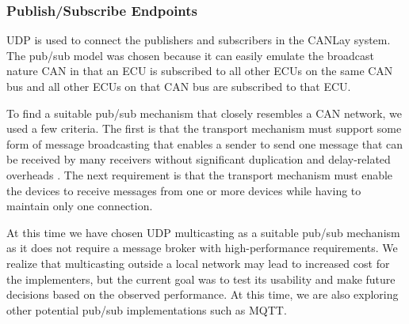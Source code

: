 \documentclass[letterpaper,twocolumn,12pt]{article}
\begin{document}
\subsubsection{Publish/Subscribe Endpoints}
UDP is used to connect the publishers and subscribers in the CANLay system. 
The pub/sub model was chosen because it can easily emulate the broadcast nature CAN \cite{kaiser_implementing_1999} in that an ECU is subscribed to all other ECUs on the same CAN bus and all other ECUs on that CAN bus are subscribed to that ECU. 

To find a suitable pub/sub mechanism that closely resembles a CAN network, we used a few criteria. The first is that the transport mechanism must support some form of message broadcasting that enables a sender to send one message that can be received by many receivers without significant duplication and delay-related overheads \cite{kaiser_implementing_1999}. The next requirement is that the transport mechanism must enable the devices to receive messages from one or more devices while having to maintain only one connection.

At this time we have chosen UDP multicasting as a suitable pub/sub mechanism as it does not require a message broker with high-performance requirements. We realize that multicasting outside a local network may lead to increased cost for the implementers, but the current goal was to test its usability and make future decisions based on the observed performance. At this time, we are also exploring other potential pub/sub implementations such as MQTT.
\end{document}
